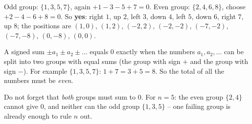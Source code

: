 {
Odd group: $\{1,3,5,7\}$, again $+1-3-5+7=0$. Even group: $\{2,4,6,8\}$, choose $+2-4-6+8=0$. So \textbf{yes}: right $1$, up $2$, left $3$, down $4$, left $5$, down $6$, right $7$, up $8$; the positions are $(1,0)$, $(1,2)$, $(-2,2)$, $(-2,-2)$, $(-7,-2)$, $(-7,-8)$, $(0,-8)$, $(0,0)$.
\begin{proofbox}A signed sum $\pm a_1\pm a_2\pm\dots$ equals $0$ exactly when the numbers $a_1,a_2,\dots$ can be split into two groups with equal sums (the group with sign $+$ and the group with sign $-$). For example $\{1,3,5,7\}$: $1+7=3+5=8$. So the total of all the numbers must be \emph{even}.\end{proofbox}
\begin{warnbox}Do not forget that \emph{both} groups must sum to $0$. For $n=5$: the even group $\{2,4\}$ cannot give $0$, and neither can the odd group $\{1,3,5\}$ -- one failing group is already enough to rule $n$ out.\end{warnbox}
}

